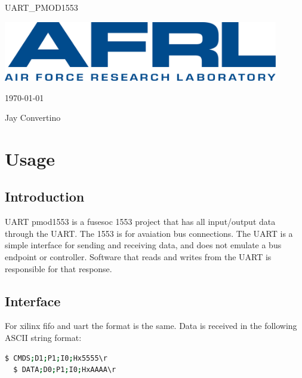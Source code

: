 \begin{titlepage}
  \begin{center}

  {\Huge UART\_PMOD1553}

  \vspace{25mm}

  \includegraphics[width=0.90\textwidth,height=\textheight,keepaspectratio]{img/AFRL.png}

  \vspace{25mm}

  \today

  \vspace{15mm}

  {\Large Jay Convertino}

  \end{center}
\end{titlepage}

\tableofcontents

\newpage

\section{Usage}

\subsection{Introduction}

\par
UART pmod1553 is a fusesoc 1553 project that has all input/output data through the UART. The 1553 is for avaiation bus connections.
The UART is a simple interface for sending and receiving data, and does not emulate a bus endpoint or controller. Software that
reads and writes from the UART is responsible for that response.

\subsection{Interface}
\par
For xilinx fifo and uart the format is the same.
Data is received in the following ASCII string format:
\begin{lstlisting}[language=bash]
  $ CMDS;D1;P1;I0;Hx5555\r
  $ DATA;D0;P1;I0;HxAAAA\r
\end{lstlisting}

